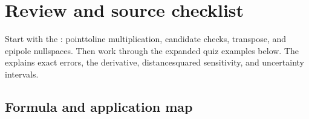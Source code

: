 \documentclass[letterpaper,11pt,english,openany,oneside]{jupyterBook}
\begin{document}
\sphinxstepscope


\section{Review and source checklist}
\label{\detokenize{lectures/lecture04/review:review-and-source-checklist}}\label{\detokenize{lectures/lecture04/review:lec04-review}}\label{\detokenize{lectures/lecture04/review::doc}}
\sphinxAtStartPar
Start with the {\hyperref[\detokenize{lectures/lecture04/epipolar-practice::doc}]{}}: point\sphinxhyphen{}to\sphinxhyphen{}line multiplication, candidate checks, transpose, and epipole nullspaces. Then work through the expanded quiz examples below. The {\hyperref[\detokenize{lectures/lecture04/stereo:stereo-depth-sensitivity}]{}} explains exact errors, the derivative, distance\sphinxhyphen{}squared sensitivity, and uncertainty intervals.


\subsection{Formula and application map}
\label{\detokenize{lectures/lecture04/review:formula-and-application-map}}
\end{document}
